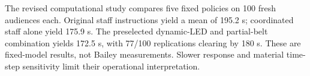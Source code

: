 The revised computational study compares five fixed policies on 100 fresh audiences each. Original staff instructions yield a mean of 195.2 s; coordinated staff alone yield 175.9 s. The preselected dynamic-LED and partial-belt combination yields 172.5 s, with 77/100 replications clearing by 180 s. These are fixed-model results, not Bailey measurements. Slower response and material time-step sensitivity limit their operational interpretation.
